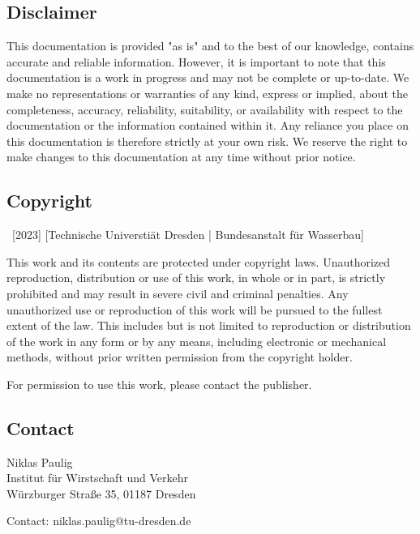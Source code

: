 \documentclass[
	a4paper, %
	12pt, %
]{persist}
\begin{document}
\begin{twothirdswidth} %
	\footnotesize %
	
	\subsection*{Disclaimer}

	This documentation is provided "as is" and to the best of our knowledge, contains accurate and reliable information. However, it is important to note that this documentation is a work in progress and may not be complete or up-to-date. We make no representations or warranties of any kind, express or implied, about the completeness, accuracy, reliability, suitability, or availability with respect to the documentation or the information contained within it. Any reliance you place on this documentation is therefore strictly at your own risk. We reserve the right to make changes to this documentation at any time without prior notice.
	
	\subsection*{Copyright}
	
	\textcopyright~[2023] [Technische Universtiät Dresden | Bundesanstalt für Wasserbau] 
	
	This work and its contents are protected under copyright laws. Unauthorized reproduction, distribution or use of this work, in whole or in part, is strictly prohibited and may result in severe civil and criminal penalties. Any unauthorized use or reproduction of this work will be pursued to the fullest extent of the law. This includes but is not limited to reproduction or distribution of the work in any form or by any means, including electronic or mechanical methods, without prior written permission from the copyright holder.

	For permission to use this work, please contact the publisher.
	
	\subsection*{Contact}
	
	Niklas Paulig\\
	Institut für Wirstschaft und Verkehr\\
	Würzburger Straße 35, 01187 Dresden
	
	Contact: niklas.paulig@tu-dresden.de
	

\end{twothirdswidth}
\end{document}
